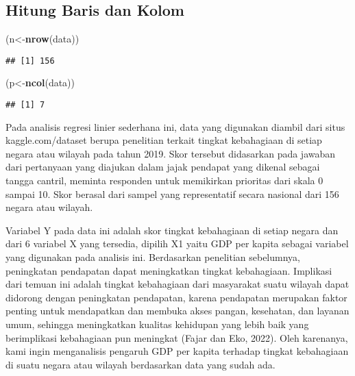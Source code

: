 \documentclass[
]{article}
\newenvironment{Shaded}{\begin{snugshade}}{\end{snugshade}}
\newcommand{\FunctionTok}[1]{\textcolor[rgb]{0.13,0.29,0.53}{\textbf{#1}}}
\newcommand{\NormalTok}[1]{#1}
\newcommand{\OtherTok}[1]{\textcolor[rgb]{0.56,0.35,0.01}{#1}}
\begin{document}
\hypertarget{hitung-baris-dan-kolom}{%
\subsection{\texorpdfstring{ Hitung Baris dan
Kolom}{ Hitung Baris dan Kolom}}\label{hitung-baris-dan-kolom}}

\begin{Shaded}
\begin{Highlighting}[]
\NormalTok{(n}\OtherTok{\textless{}{-}}\FunctionTok{nrow}\NormalTok{(data))}
\end{Highlighting}
\end{Shaded}

\begin{verbatim}
## [1] 156
\end{verbatim}

\begin{Shaded}
\begin{Highlighting}[]
\NormalTok{(p}\OtherTok{\textless{}{-}}\FunctionTok{ncol}\NormalTok{(data))}
\end{Highlighting}
\end{Shaded}

\begin{verbatim}
## [1] 7
\end{verbatim}

Pada analisis regresi linier sederhana ini, data yang digunakan diambil
dari situs kaggle.com/dataset berupa penelitian terkait tingkat
kebahagiaan di setiap negara atau wilayah pada tahun 2019. Skor tersebut
didasarkan pada jawaban dari pertanyaan yang diajukan dalam jajak
pendapat yang dikenal sebagai tangga cantril, meminta responden untuk
memikirkan prioritas dari skala 0 sampai 10. Skor berasal dari sampel
yang representatif secara nasional dari 156 negara atau wilayah.

Variabel Y pada data ini adalah skor tingkat kebahagiaan di setiap
negara dan dari 6 variabel X yang tersedia, dipilih X1 yaitu GDP per
kapita sebagai variabel yang digunakan pada analisis ini. Berdasarkan
penelitian sebelumnya, peningkatan pendapatan dapat meningkatkan tingkat
kebahagiaan. Implikasi dari temuan ini adalah tingkat kebahagiaan dari
masyarakat suatu wilayah dapat didorong dengan peningkatan pendapatan,
karena pendapatan merupakan faktor penting untuk mendapatkan dan membuka
akses pangan, kesehatan, dan layanan umum, sehingga meningkatkan
kualitas kehidupan yang lebih baik yang berimplikasi kebahagiaan pun
meningkat (Fajar dan Eko, 2022). Oleh karenanya, kami ingin menganalisis
pengaruh GDP per kapita terhadap tingkat kebahagiaan di suatu negara
atau wilayah berdasarkan data yang sudah ada.
\end{document}
